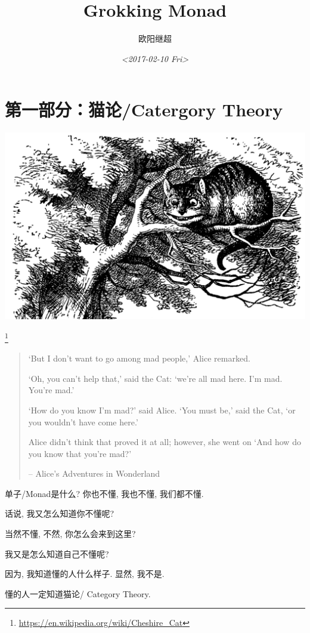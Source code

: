 \documentclass[11pt]{tufte-book}
\author{欧阳继超}
\date{\textit{<2017-02-10 Fri>}}
\title{Grokking Monad}
\begin{document}
\maketitle
\tableofcontents


\part{第一部分：猫论/Catergory Theory}
\label{sec:org0998dc3}

\begin{center}
\includegraphics[width=.9\linewidth]{./images/Cheshire_Cat.png}
\end{center} \footnote{\url{https://en.wikipedia.org/wiki/Cheshire\_Cat}}

\begin{quote}
`But I don’t want to go among mad people,’ Alice remarked.

`Oh, you can’t help that,’ said the Cat: `we’re all mad here. I’m mad. You’re mad.’

`How do you know I’m mad?’ said Alice.
`You must be,’ said the Cat, `or you wouldn’t have come here.’

Alice didn’t think that proved it at all; however, she went on `And how do you know that you’re mad?’

-- Alice's Adventures in Wonderland
\end{quote}

单子/Monad是什么? 你也不懂, 我也不懂, 我们都不懂.

话说, 我又怎么知道你不懂呢?

当然不懂, 不然, 你怎么会来到这里?

我又是怎么知道自己不懂呢?

因为, 我知道懂的人什么样子. 显然, 我不是.

懂的人一定知道猫论/ Category Theory.
\end{document}
